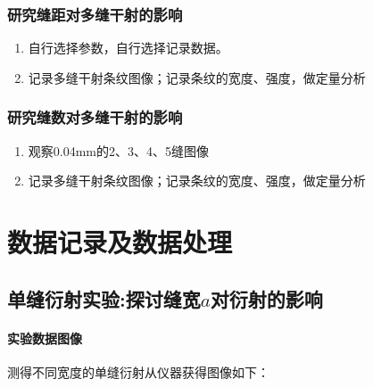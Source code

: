 \documentclass[a4paper]{../phyreport}
\begin{document}
\subsubsection{研究缝距对多缝干射的影响}

\begin{enumerate}
    \item 自行选择参数，自行选择记录数据。
    \item 记录多缝干射条纹图像；记录条纹的宽度、强度，做定量分析
\end{enumerate}

\subsubsection{研究缝数对多缝干射的影响}

\begin{enumerate}
    \item 观察0.04mm的2、3、4、5缝图像
    \item 记录多缝干射条纹图像；记录条纹的宽度、强度，做定量分析
\end{enumerate}

\section{数据记录及数据处理}

\subsection{单缝衍射实验:探讨缝宽$a$对衍射的影响}
\paragraph{实验数据图像}
测得不同宽度的单缝衍射从仪器获得图像如下：
\end{document}
